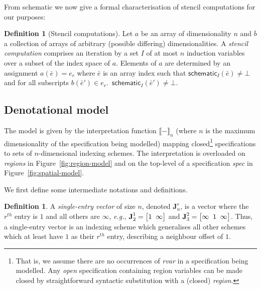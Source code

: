 \documentclass[9pt,preprint]{sigplanconf}
\newcounter{block}
\theoremstyle{definition}
\newtheorem{definition}[block]{Definition}
\newcommand{\eg}{\emph{e.g.}}
\newcommand{\interp}[1]{\llbracket{#1}\rrbracket}
\newcommand{\vtwoh}[2]{\setlength{\arraycolsep}{0em}
\left[\begin{array}{cc}#1 \; & \; #2\end{array}\right]}
\newcommand{\vthreeh}[3]{\setlength{\arraycolsep}{0em}
\left[\begin{array}{ccc}#1 \; & \; #2 \; & \; #3\end{array}\right]}
\newcommand{\singleEntry}[2]{\textbf{J}_{#2}^{#1}}
\begin{document}
From \textsf{schematic} we now give a
formal characterisation of stencil computations for our purposes:
\begin{definition}[Stencil computations]
  Let $a$ be an array of dimensionality $n$ and $\overline{b}$ a
  collection of arrays of arbitrary (possible differing)
  dimensionalities.  
  A \emph{stencil computation} comprises an iteration by a set $I$ of at
  most $n$ induction variables 
  over a subset of the index space of $a$. Elements of $a$ are determined by an
  assignment $a(\bar{e}) = e_r$ where $\bar{e}$ is an array index such
  that  $\mathsf{schematic}_I(\bar{e}) \neq \bot$ and %
  for all subscripts $b(\bar{e}') \in e_r . \, $
  $\mathsf{schematic}_I(\bar{e}') \neq \bot$. 
\label{def:stencil}
\end{definition}

\subsection{Denotational model}
\label{subsec:model}

The model is given by the interpretation function $\interp{-}_n$
(where $n$ is the maximum dimensionality of the specification being
modelled) mapping closed\footnote{That is, we assume there are no
  occurrences of \textit{rvar} in a specification being modelled.  Any
  \emph{open} specification containing region variables can be made
  closed by straightforward syntactic substitution with a (closed)
  \textit{region}.} specifications to sets of
$n$-dimensional indexing schemes. The interpretation is overloaded on
\emph{regions} in Figure~\ref{fig:region-model} and on the top-level
of a specification \textit{spec} in Figure~\ref{fig:spatial-model}.

We first define some intermediate notations and definitions.

\begin{definition}A \emph{single-entry vector} of size $n$, denoted
$\singleEntry{r}{n}$, is a vector where the $r^{th}$ entry is $1$
and all others are $\infty$, \eg{}, $\singleEntry{1}{2} =
\vtwoh{1}{\infty}$ and $\singleEntry{2}{3} = \vthreeh{\infty}{1}{\infty}$.
Thus, a single-entry vector is an indexing scheme which generalises
all other schemes which at least have $1$ as their $r^{th}$ entry,
describing a neighbour offset of $1$.
\end{definition}
\end{document}
